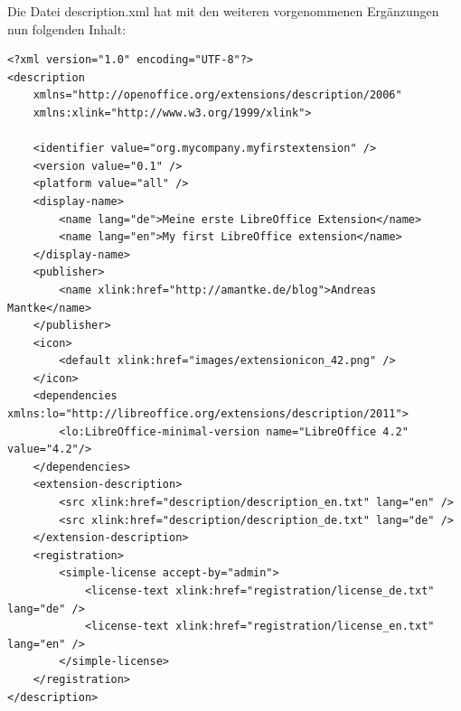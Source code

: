 \documentclass[a4paper,10pt,pagesize,titlepage]{scrbook}
\begin{document}
Die Datei description.xml hat mit den weiteren vorgenommenen Ergänzungen nun folgenden Inhalt:

\begin{lstlisting}
<?xml version="1.0" encoding="UTF-8"?>
<description
    xmlns="http://openoffice.org/extensions/description/2006"
    xmlns:xlink="http://www.w3.org/1999/xlink">

    <identifier value="org.mycompany.myfirstextension" />
    <version value="0.1" />
    <platform value="all" />
    <display-name>
        <name lang="de">Meine erste LibreOffice Extension</name>
        <name lang="en">My first LibreOffice extension</name>
    </display-name>
    <publisher>
        <name xlink:href="http://amantke.de/blog">Andreas Mantke</name>
    </publisher>
    <icon>
        <default xlink:href="images/extensionicon_42.png" />
    </icon>
    <dependencies xmlns:lo="http://libreoffice.org/extensions/description/2011">
        <lo:LibreOffice-minimal-version name="LibreOffice 4.2" value="4.2"/>
    </dependencies>
    <extension-description>
        <src xlink:href="description/description_en.txt" lang="en" />
        <src xlink:href="description/description_de.txt" lang="de" />
    </extension-description>
    <registration>
        <simple-license accept-by="admin">
            <license-text xlink:href="registration/license_de.txt" lang="de" />
            <license-text xlink:href="registration/license_en.txt" lang="en" />
        </simple-license>
    </registration>
</description>

\end{lstlisting}
\end{document}
